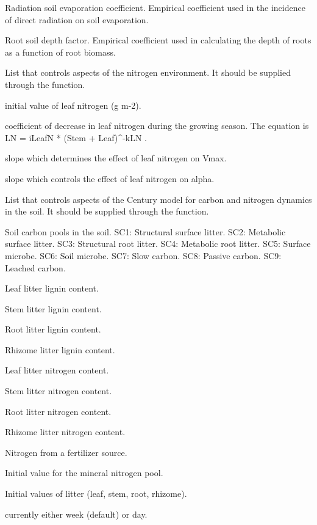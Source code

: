 \documentclass[letterpaper]{book}
\begin{document}
\begin{Arguments}
\begin{ldescription}
 Radiation soil evaporation coefficient.
Empirical coefficient used in the incidence of direct
radiation on soil evaporation.

 Root soil depth factor. Empirical coefficient
used in calculating the depth of roots as a function of
root biomass.

\item[\code{nitroControl}] List that controls aspects of the
nitrogen environment. It should be supplied through the
 function.

 initial value of leaf nitrogen (g m-2).

 coefficient of decrease in leaf nitrogen
during the growing season. The equation is LN = iLeafN *
(Stem + Leaf)\textasciicircum{}-kLN .

 slope which determines the effect of leaf
nitrogen on Vmax.

 slope which controls the effect of leaf
nitrogen on alpha.

\item[\code{centuryControl}] List that controls aspects of the
Century model for carbon and nitrogen dynamics in the
soil. It should be supplied through the
 function.

 Soil carbon pools in the soil.  SC1:
Structural surface litter. SC2: Metabolic surface litter.
SC3: Structural root litter.  SC4: Metabolic root litter.
SC5: Surface microbe.  SC6: Soil microbe.  SC7: Slow
carbon. SC8: Passive carbon.  SC9: Leached carbon.

 Leaf litter lignin content.

 Stem litter lignin content.

 Root litter lignin content.

 Rhizome litter lignin content.

 Leaf litter nitrogen content.

 Stem litter nitrogen content.

 Root litter nitrogen content.

 Rhizome litter nitrogen content.

 Nitrogen from a fertilizer source.

 Initial value for the mineral nitrogen pool.

 Initial values of litter (leaf, stem, root,
rhizome).

 currently either week (default) or day.
\end{ldescription}
\end{Arguments}
\end{document}
